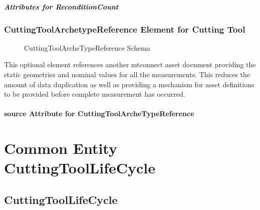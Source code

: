 \subparagraph{Attributes for ReconditionCount}\mbox{}



\pagebreak

\subsubsection{CuttingToolArchetypeReference Element for Cutting Tool}\mbox{}

\begin{figure}[ht]
  \centering
  \caption{CuttingToolArcheTypeReference Schema}
  \label{fig:cuttingtoolarchetypereference-schema}
\end{figure}

\FloatBarrier

This optional element references another \gls{mtconnect asset} document providing the static geometries and nominal values for all the measurements. This reduces the amount of data duplication as well as providing a mechanism for asset definitions to be provided before complete measurement has occurred.

\paragraph{source Attribute for CuttingToolArcheTypeReference}\mbox{}



\section{Common Entity CuttingToolLifeCycle}
\label{sec:Common Entity CuttingToolLifeCycle}

\subsection{CuttingToolLifeCycle}
\label{sec:CuttingToolLifeCycle}


